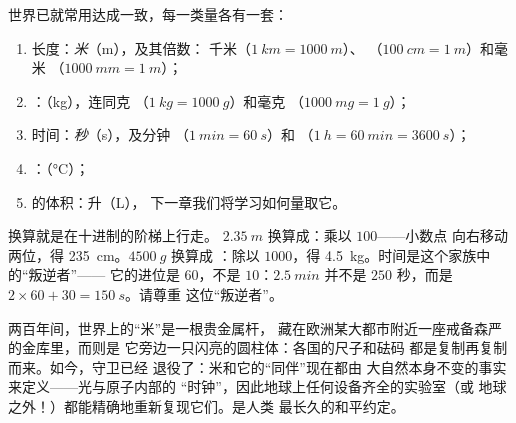 \begin{definition}[科学家的入门工具包]\label{def:g6:measurement-in-science:units}
世界已就常用达成一致，每一类量各有一套：
\begin{enumerate}
  \item 长度：\emph{米}（\unit{m}），及其倍数：
        千米（$\qty{1}{km} = \qty{1000}{m}$）、
        （$\qty{100}{cm} = \qty{1}{m}$）和毫米
        （$\qty{1000}{mm} = \qty{1}{m}$）；
  \item {}：\emph{}（\unit{kg}），连同克
        （$\qty{1}{kg} = \qty{1000}{g}$）和毫克
        （$\qty{1000}{mg} = \qty{1}{g}$）；
  \item 时间：\emph{秒}（\unit{s}），及分钟
        （$\qty{1}{min} = \qty{60}{s}$）和
        （$\qty{1}{h} = \qty{60}{min} = \qty{3600}{s}$）；
  \item {}：（\unit{\celsius}）；
  \item {}的体积：升（\unit{L}），
        下一章我们将学习如何量取它。
\end{enumerate}
\end{definition}

\begin{example}[像科学家一样换算]\label{ex:g6:measurement-in-science:convert}
换算就是在十进制的阶梯上行走。
$\qty{2.35}{m}$ 换算成：乘以 $100$——小数点
向右移动两位，得 \qty{235}{cm}。$\qty{4500}{g}$ 换算成
：除以 $1000$，得 \qty{4.5}{kg}。时间是这个家族中的“叛逆者”——
它的进位是 $60$，不是 $10$：$\qty{2.5}{min}$ 并不是
$250$ 秒，而是 $2 \times 60 + 30 = \qty{150}{s}$。请尊重
这位“叛逆者”。
\end{example}

\begin{remark}[谁在守护米的标准？]\label{rem:g6:measurement-in-science:guard}
两百年间，世界上的“米”是一根贵金属杆，
藏在欧洲某大都市附近一座戒备森严的金库里，而则是
它旁边一只闪亮的圆柱体：各国的尺子和砝码
都是复制再复制而来。如今，守卫已经
退役了：米和它的“同伴”现在都由
大自然本身不变的事实来定义——光与原子内部的
“时钟”，因此地球上任何设备齐全的实验室（或
地球之外！）都能精确地重新复现它们。是人类
最长久的和平约定。
\end{remark}

